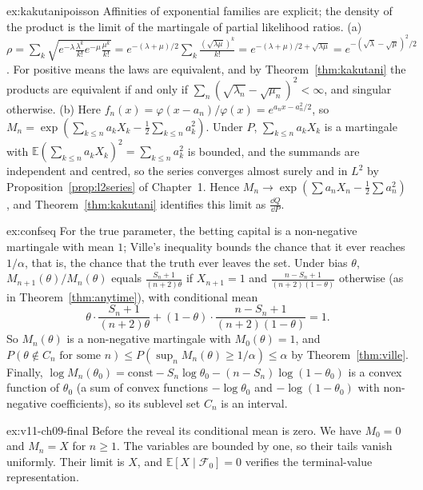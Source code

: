 \begin{solution}{ex:kakutanipoisson}
\idea Affinities of exponential families are explicit; the density of the product is the limit of the martingale of partial likelihood ratios.
\writeup (a) $\rho=\sum_k\sqrt{e^{-\lambda}\frac{\lambda^k}{k!}e^{-\mu}\frac{\mu^k}{k!}}=e^{-(\lambda+\mu)/2}\sum_k\frac{(\sqrt{\lambda\mu})^k}{k!}=e^{-(\lambda+\mu)/2+\sqrt{\lambda\mu}}=e^{-(\sqrt\lambda-\sqrt\mu)^2/2}$. For positive means the laws are equivalent,
and by Theorem~\ref{thm:kakutani} the products are equivalent if and only if $\sum_n(\sqrt{\lambda_n}-\sqrt{\mu_n})^2<\infty$, and singular otherwise.
(b) Here $f_n(x)=\varphi(x-a_n)/\varphi(x)=e^{a_nx-a_n^2/2}$, so $M_n=\exp(\sum_{k\le n}a_kX_k-\frac12\sum_{k\le n}a_k^2)$. Under $P$, $\sum_{k\le n}a_kX_k$ is a martingale with
$\mathbb E(\sum_{k\le n}a_kX_k)^2=\sum_{k\le n}a_k^2$ is bounded, and the summands are independent and centred, so the series converges almost surely and in $L^2$ by Proposition~\ref{prop:l2series} of Chapter~1. Hence $M_n\to\exp(\sum a_nX_n-\frac12\sum a_n^2)$, and Theorem~\ref{thm:kakutani} identifies this limit as
$\frac{\dd Q}{\dd P}$.
\end{solution}

\begin{solution}{ex:confseq}
\idea For the true parameter, the betting capital is a non-negative martingale with mean $1$; Ville's inequality bounds the chance that it ever reaches $1/\alpha$, that is, the chance that the truth ever leaves the set.
\writeup Under bias $\theta$, $M_{n+1}(\theta)/M_n(\theta)$ equals $\frac{S_n+1}{(n+2)\theta}$ if $X_{n+1}=1$ and $\frac{n-S_n+1}{(n+2)(1-\theta)}$ otherwise (as in Theorem~\ref{thm:anytime}), with conditional mean
\[
\theta\cdot\frac{S_n+1}{(n+2)\theta}+(1-\theta)\cdot\frac{n-S_n+1}{(n+2)(1-\theta)}=1.
\]
So $M_n(\theta)$ is a non-negative martingale with $M_0(\theta)=1$, and $P(\theta\notin C_n\text{ for some }n)\le P(\sup_nM_n(\theta)\ge1/\alpha)\le\alpha$ by Theorem~\ref{thm:ville}. Finally,
$\log M_n(\theta_0)=\text{const}-S_n\log\theta_0-(n-S_n)\log(1-\theta_0)$ is a convex function of $\theta_0$ (a sum of convex functions $-\log\theta_0$ and $-\log(1-\theta_0)$ with non-negative coefficients), so its sublevel set
$C_n$ is an interval.
\end{solution}

\begin{solution}{ex:v11-ch09-final}
\idea Before the reveal its conditional mean is zero.
\writeup We have $M_0=0$ and $M_n=X$ for $n\ge1$. The variables are bounded by one, so their tails vanish uniformly. Their limit is $X$, and $\mathbb E[X\mid\mathcal F_0]=0$ verifies the terminal-value representation.
\end{solution}

